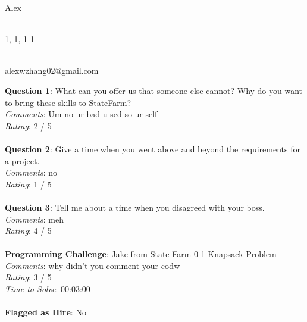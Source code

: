 \documentclass[12pt]{article}
\begin{document}
{\LARGE \begin{center}Alex\end{center}}

\begin{multicols}{2}
 \\
1, 1, 1 1
\columnbreak

 \\
alexwzhang02@gmail.com
\end{multicols}

\noindent
\textbf{Question 1}: What can you offer us that someone else cannot? Why do you want to bring these skills to StateFarm?
\\\noindent
\textit{Comments}: Um no ur bad u sed so ur self
\\\noindent
\textit{Rating}: 2 / 5
\\\\
\noindent
\textbf{Question 2}: Give a time when you went above and beyond the requirements for a project.
\\\noindent
\textit{Comments}: no
\\\noindent
\textit{Rating}: 1 / 5
\\\\
\noindent
\textbf{Question 3}: Tell me about a time when you disagreed with your boss.
\\\noindent
\textit{Comments}: meh
\\\noindent
\textit{Rating}: 4 / 5
\\\\
\noindent
\textbf{Programming Challenge}: Jake from State Farm 0-1 Knapsack Problem
\\\noindent
\textit{Comments}: why didn't you comment your codw
\\\noindent
\textit{Rating}: 3 / 5
\\\noindent
\textit{Time to Solve}: 00:03:00
\\\\
\textbf{Flagged as Hire}: No
\\\\ 
\end{document}
